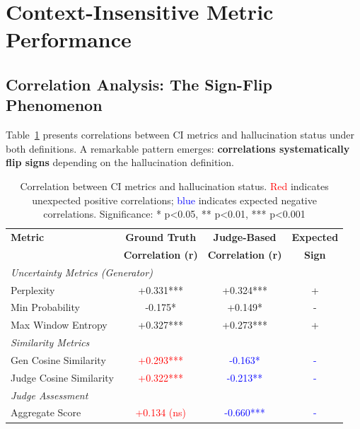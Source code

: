 \section{Context-Insensitive Metric Performance}

\subsection{Correlation Analysis: The Sign-Flip Phenomenon}

Table~\ref{tab:correlation_comparison} presents correlations between CI metrics and hallucination status under both definitions. A remarkable pattern emerges: \textbf{correlations systematically flip signs} depending on the hallucination definition.

\begin{table}[h]
\centering
\small
\begin{tabular}{lccc}
\toprule
\textbf{Metric} & \textbf{Ground Truth} & \textbf{Judge-Based} & \textbf{Expected} \\
 & \textbf{Correlation (r)} & \textbf{Correlation (r)} & \textbf{Sign} \\
\midrule
\multicolumn{4}{l}{\textit{Uncertainty Metrics (Generator)}} \\
Perplexity & +0.331*** & +0.324*** & + \\
Min Probability & -0.175* & +0.149* & - \\
Max Window Entropy & +0.327*** & +0.273*** & + \\
\midrule
\multicolumn{4}{l}{\textit{Similarity Metrics}} \\
Gen Cosine Similarity & \textcolor{red}{+0.293***} & \textcolor{blue}{-0.163*} & \textcolor{blue}{-} \\
Judge Cosine Similarity & \textcolor{red}{+0.322***} & \textcolor{blue}{-0.213**} & \textcolor{blue}{-} \\
\midrule
\multicolumn{4}{l}{\textit{Judge Assessment}} \\
Aggregate Score & \textcolor{red}{+0.134 (ns)} & \textcolor{blue}{-0.660***} & \textcolor{blue}{-} \\
\bottomrule
\end{tabular}
\caption{Correlation between CI metrics and hallucination status. \textcolor{red}{Red} indicates unexpected positive correlations; \textcolor{blue}{blue} indicates expected negative correlations. Significance: * p<0.05, ** p<0.01, *** p<0.001}
\label{tab:correlation_comparison}
\end{table}

